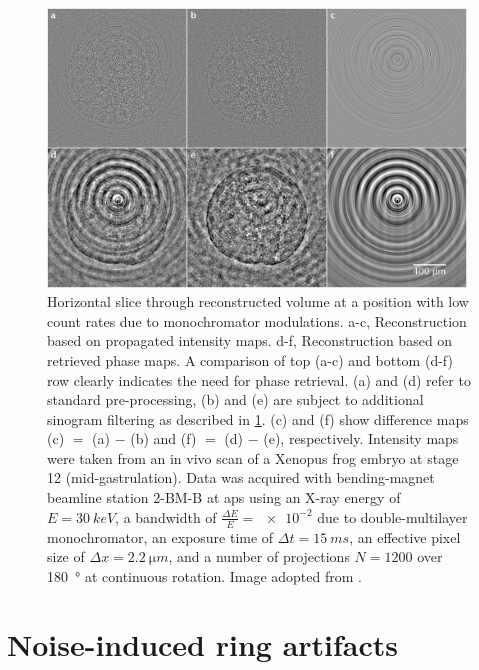 \documentclass[
twoside,
openright,
titlepage,
numbers=noenddot,
headinclude,
fleqn,
a4paper,
footinclude=true,
cleardoublepage=empty,
abstractoff,
BCOR=5mm,
paper=a4,
fontsize=11pt,
british,ngerman,american,
]{scrreprt}
\begin{document}
\begin{figure} 
  \centering
  \small
  \includegraphics[width=0.99\textwidth]
{figures/TomoRings/PhaseRetrievalAndFiltering_VolumeSlices_LowCounts.png}
\caption[Filtering of noise-induced ring artifacts.]{%
  Horizontal slice through reconstructed volume at a position with low
  count rates due to monochromator modulations.  a-c, Reconstruction
  based on propagated intensity maps.  d-f, Reconstruction based on
  retrieved phase maps.  A comparison of top (a-c) and bottom (d-f)
  row clearly indicates the need for phase retrieval. (a) and (d)
  refer to standard pre-processing, (b) and (e) are subject to
  additional sinogram filtering as described in
  \cref{sec:ring-artifacts}.  (c) and (f) show difference maps (c) $=$
  (a) $-$ (b) and (f) $=$ (d) $-$ (e), respectively.  Intensity maps
  were taken from an in vivo scan of a Xenopus frog embryo at stage 12
  (mid-gastrulation).  Data was acquired with bending-magnet beamline
  station 2-BM-B at \ac{aps} using an X-ray energy of $E =
  \SI{30}{keV}$, a bandwidth of $\frac{\Delta E}{E} = \num{e-2}$ due
  to double-multilayer monochromator, an exposure time of $\Delta t =
  \SI{15}{ms}$, an effective pixel size of $\Delta x = \SI{2.2}{\micro
    m}$, and a number of projections $N=1200$ over \SI{180}{\degree}
  at continuous rotation.  Image adopted from
  \cite{Moosmann2014natp}.}
  \label{fig:tomo-rings}
\end{figure}

\section{Noise-induced ring artifacts}
\label{sec:ring-artifacts}
\end{document}
